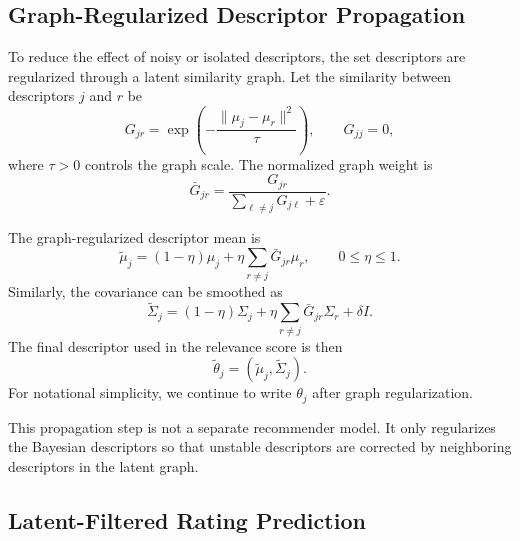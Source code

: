 \documentclass{article}
\theoremstyle{plain}
\theoremstyle{definition}
\theoremstyle{remark}
\begin{document}
\subsection{Graph-Regularized Descriptor Propagation}
\label{subsec:graph_regularization}

To reduce the effect of noisy or isolated descriptors, the set descriptors are regularized through a latent similarity graph. Let the similarity between descriptors \(j\) and \(r\) be
\begin{equation}
	\label{eq:descriptor_similarity}
	G_{jr}
	=
	\exp\left(
	-\frac{\|\mu_j-\mu_r\|^2}{\tau}
	\right),
	\qquad
	G_{jj}=0,
\end{equation}
where \(\tau>0\) controls the graph scale. The normalized graph weight is
\begin{equation}
	\label{eq:normalized_graph}
	\bar G_{jr}
	=
	\frac{
		G_{jr}
	}{
		\sum_{\ell\neq j}G_{j\ell}+\varepsilon
	}.
\end{equation}

The graph-regularized descriptor mean is
\begin{equation}
	\label{eq:graph_regularized_mean}
	\widetilde\mu_j
	=
	(1-\eta)\mu_j
	+
	\eta
	\sum_{r\neq j}
	\bar G_{jr}\mu_r,
	\qquad
	0\leq\eta\leq 1.
\end{equation}
Similarly, the covariance can be smoothed as
\begin{equation}
	\label{eq:graph_regularized_covariance}
	\widetilde\Sigma_j
	=
	(1-\eta)\Sigma_j
	+
	\eta
	\sum_{r\neq j}
	\bar G_{jr}\Sigma_r
	+
	\delta I.
\end{equation}
The final descriptor used in the relevance score is then
\[
\widetilde\theta_j
=
(\widetilde\mu_j,\widetilde\Sigma_j).
\]
For notational simplicity, we continue to write \(\theta_j\) after graph regularization.

This propagation step is not a separate recommender model. It only regularizes the Bayesian descriptors so that unstable descriptors are corrected by neighboring descriptors in the latent graph.

\subsection{Latent-Filtered Rating Prediction}
\label{subsec:rating_prediction}
\end{document}
